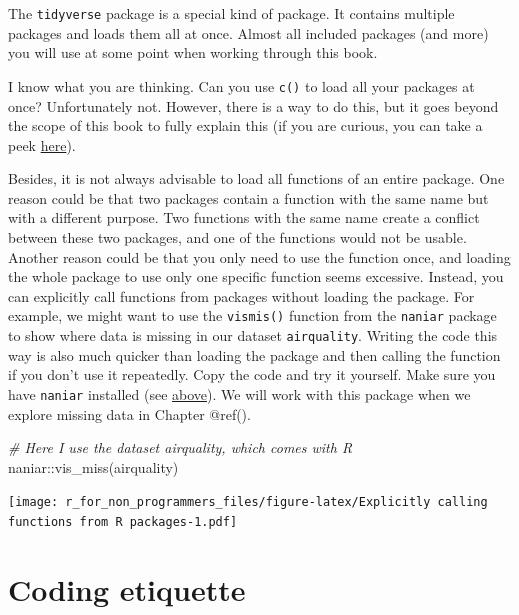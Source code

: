 \documentclass[
]{book}
\newenvironment{Shaded}{\begin{snugshade}}{\end{snugshade}}
\newcommand{\CommentTok}[1]{\textcolor[rgb]{0.56,0.35,0.01}{\textit{#1}}}
\newcommand{\FunctionTok}[1]{\textcolor[rgb]{0.00,0.00,0.00}{#1}}
\newcommand{\NormalTok}[1]{#1}
\newcommand{\SpecialCharTok}[1]{\textcolor[rgb]{0.00,0.00,0.00}{#1}}
\begin{document}
The \texttt{tidyverse} package is a special kind of package. It contains multiple packages and loads them all at once. Almost all included packages (and more) you will use at some point when working through this book.

I know what you are thinking. Can you use \texttt{c()} to load all your packages at once? Unfortunately not. However, there is a way to do this, but it goes beyond the scope of this book to fully explain this (if you are curious, you can take a peek \href{https://stackoverflow.com/questions/8175912/load-multiple-packages-at-once}{here}).

Besides, it is not always advisable to load all functions of an entire package. One reason could be that two packages contain a function with the same name but with a different purpose. Two functions with the same name create a conflict between these two packages, and one of the functions would not be usable. Another reason could be that you only need to use the function once, and loading the whole package to use only one specific function seems excessive. Instead, you can explicitly call functions from packages without loading the package. For example, we might want to use the \texttt{vismis()} function from the \texttt{naniar} package to show where data is missing in our dataset \texttt{airquality}. Writing the code this way is also much quicker than loading the package and then calling the function if you don't use it repeatedly. Copy the code and try it yourself. Make sure you have \texttt{naniar} installed (see \protect\hyperlink{install-packages-tidyverse-nanair-psych}{above}). We will work with this package when we explore missing data in Chapter @ref().

\begin{Shaded}
\begin{Highlighting}[]
\CommentTok{\# Here I use the dataset \textquotesingle{}airquality\textquotesingle{}, which comes with R}
\NormalTok{naniar}\SpecialCharTok{::}\FunctionTok{vis\_miss}\NormalTok{(airquality)}
\end{Highlighting}
\end{Shaded}

\texttt{[image: r\_for\_non\_programmers\_files/figure-latex/Explicitly calling functions from R packages-1.pdf]}

\hypertarget{coding-etiquette}{%
\section{Coding etiquette}\label{coding-etiquette}}
\end{document}
